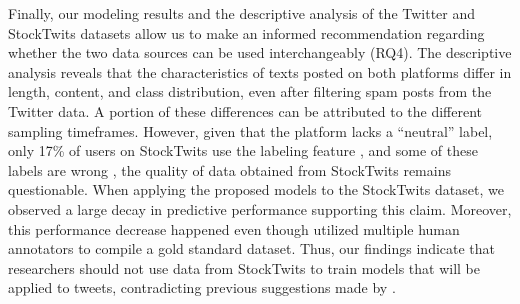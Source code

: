 Finally, our modeling results and the descriptive analysis of the Twitter and StockTwits datasets allow us to make an informed recommendation regarding whether the two data sources can be used interchangeably (RQ4). The descriptive analysis reveals that the characteristics of texts posted on both platforms differ in length, content, and class distribution, even after filtering spam posts from the Twitter data. A portion of these differences can be attributed to the different sampling timeframes. However, given that the platform lacks a ``neutral'' label, only 17\% of users on StockTwits use the labeling feature , and some of these labels are wrong , the quality of data obtained from StockTwits remains questionable. When applying the proposed models to the StockTwits dataset, we observed a large decay in predictive performance supporting this claim. Moreover, this performance decrease happened even though  utilized multiple human annotators to compile a gold standard dataset. Thus, our findings indicate that researchers should not use data from StockTwits to train models that will be applied to tweets, contradicting previous suggestions made by .

